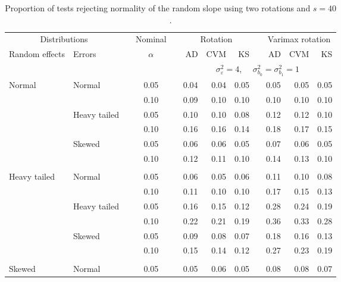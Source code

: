 \begin{table}[ht]
\centering
\caption{\label{tab:simb140}Proportion of tests rejecting normality of the random slope using two rotations and $s = 40$.}
\begin{scriptsize}
\begin{tabular}{ll p{.1cm} c p{.1cm} rrr p{.1cm} rrr}
  \hline
  \multicolumn{2}{c}{Distributions}& & Nominal & &  \multicolumn{3}{c}{Rotation} & & \multicolumn{3}{c}{Varimax rotation} \\ \cline{1-2} \cline{6-8} \cline{10-12}   
  Random effects & Errors & & $\alpha$ & & AD & CVM & KS & & AD & CVM & KS \\ 
   \hline
& && && \multicolumn{7}{c}{$\sigma_{\varepsilon}^2 = 4$, \ \ $\sigma_{b_0}^2 = \sigma_{b_1}^2 = 1$} \\ \cline{6-12}
\rowcolor{gray!20}Normal       & Normal       && 0.05 &&  0.04 & 0.04 & 0.05 && 0.05 & 0.05 & 0.05 \\ 
\rowcolor{gray!20}             &              && 0.10 &&  0.09 & 0.10 & 0.10 && 0.10 & 0.10 & 0.10 \\ 
\rowcolor{gray!20}             & Heavy tailed && 0.05 &&  0.10 & 0.10 & 0.08 && 0.12 & 0.12 & 0.10 \\ 
\rowcolor{gray!20}             &              && 0.10 &&  0.16 & 0.16 & 0.14 && 0.18 & 0.17 & 0.15 \\ 
\rowcolor{gray!20}             & Skewed       && 0.05 &&  0.06 & 0.06 & 0.05 && 0.07 & 0.06 & 0.05 \\ 
\rowcolor{gray!20}             &              && 0.10 &&  0.12 & 0.11 & 0.10 && 0.14 & 0.13 & 0.10 \\ 
             &&&&&&&&&&&\\
Heavy tailed & Normal       && 0.05 &&  0.06 & 0.05 & 0.06 && 0.11 & 0.10 & 0.08 \\ 
             &              && 0.10 &&  0.11 & 0.10 & 0.10 && 0.17 & 0.15 & 0.13 \\ 
             & Heavy tailed && 0.05 &&  0.16 & 0.15 & 0.12 && 0.28 & 0.24 & 0.19 \\ 
             &              && 0.10 &&  0.22 & 0.21 & 0.19 && 0.36 & 0.33 & 0.28 \\ 
             & Skewed       && 0.05 &&  0.09 & 0.08 & 0.07 && 0.18 & 0.16 & 0.13 \\ 
             &              && 0.10 &&  0.15 & 0.14 & 0.12 && 0.27 & 0.23 & 0.19 \\ 
             &&&&&&&&&&&\\
Skewed       & Normal       && 0.05 &&  0.05 & 0.06 & 0.05 && 0.08 & 0.08 & 0.07 \\ 

\end{tabular}
\end{scriptsize}
\end{table}
